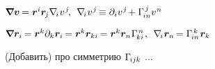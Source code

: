 \begin{otherlanguage}{russian}
$\bm{\nabla}\hspace{-0.2ex} \bm{v} \hspace{-0.16ex}
= \bm{r}^{i} \bm{r}_{\hspace{-0.2ex}j} \nabla_{\hspace{-0.32ex}i\hspace{.1ex}} v^{\hspace{.12ex}j} \hspace{-0.25ex} , \:\:
\nabla_{\hspace{-0.32ex}i\hspace{.1ex}} v^{\hspace{.12ex}j} \hspace{-0.2ex} \equiv
\partial_i v^{\hspace{.12ex}j} \hspace{-0.25ex} + \Gamma_{\hspace{-0.25ex}in}^{\hspace{.25ex}j} v^{\hspace{.1ex}n}$

$\bm{\nabla}\hspace{-0.2ex} \bm{r}_i \hspace{-0.2ex}
= \bm{r}^k \partial_k \bm{r}_i \hspace{-0.2ex}
= \bm{r}^k \bm{r}_{ki} \hspace{-0.2ex}
= \bm{r}^k \bm{r}_n \hspace{.1ex} \Gamma_{\hspace{-0.25ex}ki}^{\hspace{.25ex}n}
\hspace{.2ex} , \:\:
\nabla_{\hspace{-0.32ex}i\hspace{.1ex}} \bm{r}_{n} \hspace{-0.25ex}
= \Gamma_{\hspace{-0.25ex}in}^{\hspace{.25ex}k} \hspace{.16ex} \bm{r}_k$

\vspace{.25em} \noindent (Добавить) про симметрию $\Gamma_{\hspace{-0.25ex}ijk}$ ...


\end{otherlanguage}
